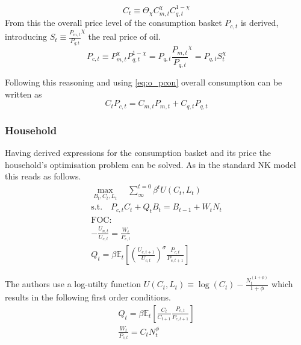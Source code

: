 \documentclass[12pt,a4paper,english]{article} %
\newcommand{\E}{\mathbb{E}} %
\begin{document}
	\begin{equation}
		C_t \equiv \Theta_\chi C_{m,t}^\chi C_{q,t}^{1-\chi}
	\end{equation}
	From this the overall price level of the consumption basket $P_{c,t}$ is derived, introducing $S_t \equiv \frac{P_{m,t}}{P_{q,t}}^\chi$ the real price of oil.
	\begin{equation}
		P_{c,t} \equiv P_{m,t}^\chi P_{q,t}^{1-\chi} 
			= P_{q,t} \frac{P_{m,t}}{P_{q,t}}^\chi
			= P_{q,t} S_t^\chi
	\end{equation}
		
	Following this reasoning and using \ref{eq:o_pcon} overall consumption can be written as 
	\begin{equation}
		C_t P_{c,t} = C_{m,t}P_{m,t} + C_{q,t}P_{q,t}
	\end{equation}

	\subsubsection{Household}
	Having derived expressions for the consumption basket and its price the household's optimisation problem can be solved. As in the standard NK model this reads as follows. 
	\begin{equation}
		\begin{aligned}
			\max_{B_t, C_t, L_t} \quad \sum_{\infty}^{t=0} \beta^{t} U(C_{t}, L_{t}) \\
			\textrm{s.t.} \quad P_{c,t} C_t + Q_t B_t = B_{t-1} + W_t N_t \\
			\textrm{FOC:} \\
			- \frac{U_{n,t}}{U_{c, t}} = \frac{W_t}{P_{c,t}}\\
			Q_t = \beta \E_t \left[ \left( \frac{U_{c, t+1}}{U_{c,t}} \right)^\sigma \frac{P_{c,t}}{P_{c,t+1}} \right] 			
		\end{aligned}
	\end{equation}
	
	The authors use a log-utilty function $U(C_t,L_t) \equiv \log(C_t) - \frac{N_t^(1+\phi)}{1+\phi}$ which results in the following first order conditions.
	\begin{equation}
		\begin{aligned}
			Q_t = \beta \E_t \left[ \frac{C_t}{C_{t+1}} \frac{P_{c,t}}{P_{c,t+1}} \right] \\
			\frac{W_t}{P_{c,t}} = C_t N_t^\phi
		\end{aligned}
	\end{equation}
\end{document}
